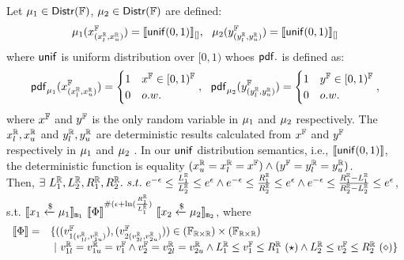 \documentclass[a4paper,11pt]{article}
\begin{document}
\begin{thm}
\label{thm:unif_coupling}
Let $\mu_1 \in \mathsf{Distr}(\mathbb{F})$, $\mu_2 \in \mathsf{Distr}(\mathbb{F})$ are defined:
\[
	\mu_1(x^{\mathbb{F}}_{(x^{\mathbb{R}}_l, x^{\mathbb{R}}_u)}) 
	= \llbracket \mathsf{unif}(0, 1) \rrbracket_{[]},
~~
	\mu_2(y^{\mathbb{F}}_{(y^{\mathbb{R}}_l, y^{\mathbb{R}}_u)}) 
	= \llbracket \mathsf{unif}(0, 1) \rrbracket_{[]}
\]
where $\mathsf{unif}$ is uniform distribution over $[0, 1)$ whoes $\mathsf{pdf}.$ is defined as:
\[
	\mathsf{pdf}_{\mu_1}(x^{\mathbb{F}}_{(x^{\mathbb{R}}_l, x^{\mathbb{R}}_u)}) = 
	\begin{cases}
	1 & x^{\mathbb{F}} \in [0, 1)^{\mathbb{F}} 
	\\
	0       & o.w.
	\end{cases},
	~~
	\mathsf{pdf}_{\mu_2}(y^{\mathbb{F}}_{(y^{\mathbb{R}}_l, y^{\mathbb{R}}_u)}) = 
	\begin{cases}
	1 & y^{\mathbb{F}} \in [0, 1)^{\mathbb{F}}
	\\
	0       & o.w.
	\end{cases},
\]
where $x^{\mathbb{F}}$ and $y^{\mathbb{F}}$ is the only random variable in $\mu_1$ and $\mu_2$ respectively. 
The $x^{\mathbb{R}}_l, x^{\mathbb{R}}_u$ and $y^{\mathbb{R}}_l, y^{\mathbb{R}}_u$ are deterministic results calculated from $x^{\mathbb{F}}$ and $y^{\mathbb{F}}$ respectively in $\mu_1$ and $\mu_2$ . In our $\mathsf{unif}$ distribution semantics, i.e., $\llbracket \mathsf{unif}(0, 1) \rrbracket$, the deterministic function is equality $(x^{\mathbb{R}}_u = x^{\mathbb{R}}_l = x^{\mathbb{F}}) \land (y^{\mathbb{F}} = y^{\mathbb{R}}_l = y^{\mathbb{R}}_u)$.
\\
Then, $	\exists ~ L^{\mathbb{R}}_1, L^{\mathbb{R}}_2, R^{\mathbb{R}}_1, R^{\mathbb{R}}_2. ~ s.t. ~
	e^{-\epsilon} \leq 
	\frac{L^{\mathbb{R}}_1}{L^{\mathbb{R}}_2}
	\leq e^{\epsilon}
	\land
	e^{-\epsilon} \leq 
	\frac{R^{\mathbb{R}}_1}{R^{\mathbb{R}}_2}
	\leq e^{\epsilon}
	\land
	e^{-\epsilon} \leq 
	\frac{R^{\mathbb{R}}_1 - L^{\mathbb{R}}_1}{R^{\mathbb{R}}_2 - L^{\mathbb{R}}_2}
	\leq e^{\epsilon}$, s.t. 
$\llbracket x_1 \xleftarrow{\$} \mu_1 \rrbracket_{\mathtt{m}_1} 
	~ \llbracket \Phi \rrbracket^{\#(\epsilon + \ln(\frac{R^{\mathbb{R}}_1}{L^{\mathbb{R}}_1})} ~
\llbracket x_2 \xleftarrow{\$} \mu_2 \rrbracket_{\mathtt{m}_2}$, 
where
\[
\begin{array}{rl}
	\sem{\Phi} = &
	\{((\fval_{1(\rval_{1l}, \rval_{1u})}), (\fval_{2(\rval_{2l}, \rval_{2u})})) 
	\in (\float_{\real \times \real}) \times (\float_{\real \times \real})\\
	& ~|~
	\rval_{1l} = \rval_{1u} = \fval_1 
	\land \fval_2 = \rval_{2l} = \rval_{2u}
	\land
	\rvalL_1 \leq \fval_1 \leq \rvalR_1 ~ (\star) 
	\land 
	\rvalL_2 \leq \fval_2 \leq \rvalR_2 ~ (\diamond)
	\}
\end{array}
\]
\end{thm}
%
\end{document}
